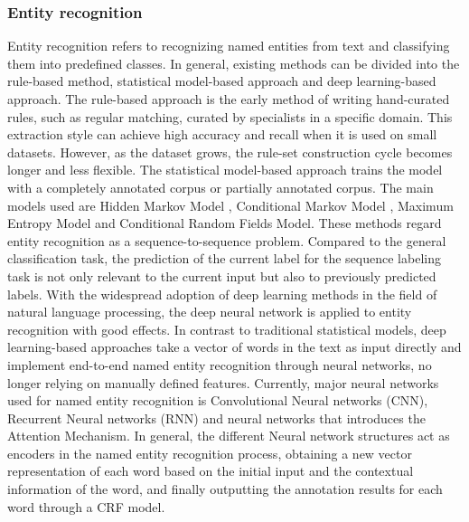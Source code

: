 \documentclass[%
 aip,
 jmp,%
 amsmath,amssymb,
 reprint,%
]{revtex4-2}
\begin{document}
\subsubsection{Entity recognition}
Entity recognition refers to recognizing named entities from text and classifying them into predefined classes\cite{al2020named}.
In general, existing methods can be divided into the rule-based method, statistical model-based approach and 
deep learning-based approach.
The rule-based approach is the early method of writing hand-curated rules, such as regular matching, curated by specialists in a specific domain. This extraction style can achieve high accuracy and recall when it is used on small datasets. However, as the dataset grows, the rule-set construction cycle becomes longer and less flexible\cite{alfred2014malay}.
The statistical model-based approach trains the model with a completely annotated corpus or partially annotated corpus.
The main models used are Hidden Markov Model \cite{fine1998hierarchical}, Conditional Markov Model \cite{cook2004conditional}, 
Maximum Entropy Model \cite{ratnaparkhi1996maximum} and Conditional Random Fields Model\cite{wallach2004conditional}. 
These methods regard entity recognition as a sequence-to-sequence problem. Compared to the general classification task, the prediction of the current label for the sequence labeling task is not only relevant to the current input but also to previously predicted labels.  
With the widespread adoption of deep learning methods in the field of natural language processing, the deep neural network is applied to entity recognition with good effects. In contrast to traditional statistical models, deep learning-based approaches take a vector of words in the text as input directly and implement end-to-end named entity recognition through neural networks, no longer relying on manually defined features.
Currently, major neural networks used for named entity
recognition is Convolutional Neural networks (CNN)\cite{o2015introduction}, Recurrent Neural networks (RNN) \cite{medsker2001recurrent} and neural networks that introduces the Attention Mechanism\cite{tilk2016bidirectional}. In general, the different Neural network structures act as encoders in the named entity recognition process, obtaining a new vector representation of each word based on the initial input and the contextual information of the word, and finally outputting the annotation results for each word through a CRF model.
\end{document}
